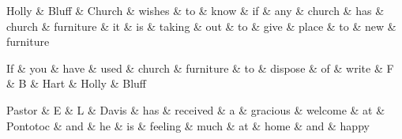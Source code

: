 \documentclass[12pt]{article}
\begin{document}
\centering
\large



\begin{dependency}[theme = simple]
\begin{deptext}[column sep=1em]
Holly \& Bluff \& Church \& wishes \& to \& know \& if \& any \& church \& has \& church \& furniture \& it \& is \& taking \& out \& to \& give \& place \& to \& new \& furniture \\
\end{deptext}
\end{dependency}

\begin{dependency}[theme = simple]
\begin{deptext}[column sep=1em]
If \& you \& have \& used \& church \& furniture \& to \& dispose \& of \& write \& F \& B \& Hart \& Holly \& Bluff \\
\end{deptext}
\end{dependency}

\begin{dependency}[theme = simple]
\begin{deptext}[column sep=1em]
Pastor \& E \& L \& Davis \& has \& received \& a \& gracious \& welcome \& at \& Pontotoc \& and \& he \& is \& feeling \& much \& at \& home \& and \& happy \\
\end{deptext}
\end{dependency}
\end{document}

